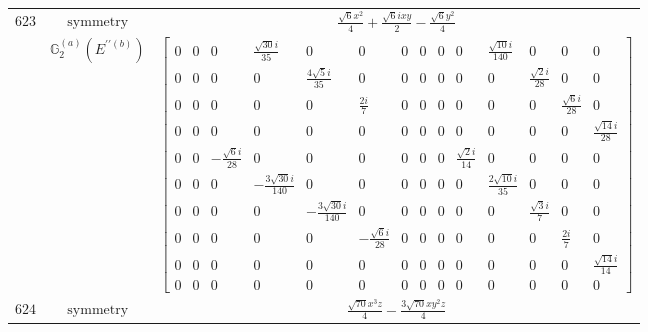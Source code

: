 \documentclass[fleqn,8pt,landscape]{jsarticle}
\begin{document}
\begin{longtable}{ccc}
$ 623 $ & $ \text{symmetry} $ & $ \frac{\sqrt{6} x^{2}}{4} + \frac{\sqrt{6} i x y}{2} - \frac{\sqrt{6} y^{2}}{4} $ \\
$  $ & $ \mathbb{G}_{2}^{(a)}(E^{\prime\prime(b)}) $ & $ \begin{bmatrix} 0 & 0 & 0 & \frac{\sqrt{30} i}{35} & 0 & 0 & 0 & 0 & 0 & 0 & \frac{\sqrt{10} i}{140} & 0 & 0 & 0 \\ 0 & 0 & 0 & 0 & \frac{4 \sqrt{5} i}{35} & 0 & 0 & 0 & 0 & 0 & 0 & \frac{\sqrt{2} i}{28} & 0 & 0 \\ 0 & 0 & 0 & 0 & 0 & \frac{2 i}{7} & 0 & 0 & 0 & 0 & 0 & 0 & \frac{\sqrt{6} i}{28} & 0 \\ 0 & 0 & 0 & 0 & 0 & 0 & 0 & 0 & 0 & 0 & 0 & 0 & 0 & \frac{\sqrt{14} i}{28} \\ 0 & 0 & - \frac{\sqrt{6} i}{28} & 0 & 0 & 0 & 0 & 0 & 0 & \frac{\sqrt{2} i}{14} & 0 & 0 & 0 & 0 \\ 0 & 0 & 0 & - \frac{3 \sqrt{30} i}{140} & 0 & 0 & 0 & 0 & 0 & 0 & \frac{2 \sqrt{10} i}{35} & 0 & 0 & 0 \\ 0 & 0 & 0 & 0 & - \frac{3 \sqrt{30} i}{140} & 0 & 0 & 0 & 0 & 0 & 0 & \frac{\sqrt{3} i}{7} & 0 & 0 \\ 0 & 0 & 0 & 0 & 0 & - \frac{\sqrt{6} i}{28} & 0 & 0 & 0 & 0 & 0 & 0 & \frac{2 i}{7} & 0 \\ 0 & 0 & 0 & 0 & 0 & 0 & 0 & 0 & 0 & 0 & 0 & 0 & 0 & \frac{\sqrt{14} i}{14} \\ 0 & 0 & 0 & 0 & 0 & 0 & 0 & 0 & 0 & 0 & 0 & 0 & 0 & 0 \end{bmatrix} $ \\ \hline
$ 624 $ & $ \text{symmetry} $ & $ \frac{\sqrt{70} x^{3} z}{4} - \frac{3 \sqrt{70} x y^{2} z}{4} $ \\

\end{longtable}
\end{document}
